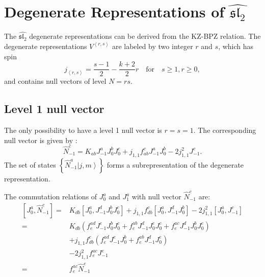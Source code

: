 \documentclass[10pt,a4paper]{article}
\numberwithin{equation}{section}
\newcommand{\ket}[1]{\left| #1 \right\rangle}
\newcommand{\vev}[1]{\left\langle #1 \right\rangle}
\begin{document}
\section{Degenerate Representations of \texorpdfstring{$\widehat{\mathfrak{sl}_{2}}$}{Lg}}
The $\widehat{\mathfrak{sl}_{2}}$ degenerate representations can be derived from the KZ-BPZ relation. The degenerate representations $V^{\vev{r,s}}$
 are labeled by two integer $r$ and $s$, which has spin
\begin{equation}
    j_{\vev{r,s}} = \frac{s-1}{2} - \frac{k+2}{2} r \quad \mathrm{for} \quad s\geq 1, r \geq 0,
\end{equation}
and contains null vectors of level $N=rs$.
\subsection{Level 1 null vector}
The only possibility to have a level 1 null vector is $r = s = 1$. The corresponding null vector is given by \cite{Stocco:2022gah}:
\begin{equation}
    \hat{N}^{c}_{-1} = K_{ab} J^{a}_{-1} J^{b}_{0} J^{c}_{0} + j_{1,1} f^{c}_{ab} J^{a}_{-1} J^{b}_{0} - 2 j^{2}_{1,1} J^{c}_{-1}. \label{NV}
\end{equation}
The set of states $\left\{ \hat{N}^{a}_{-1} \ket{j,m} \right\}$ forms a subrepresentation of the degenerate representation.\\
\par The commutation relations of $J^{a}_{0}$ and $J^{a}_{1}$ with null vector $\hat{N}^{c}_{-1}$ are:
\begin{equation}
    \begin{aligned}
        \left[ J^{a}_{0}, \hat{N}^{c}_{-1} \right] 
        =& K_{db} \left[J^{a}_{0}, J^{d}_{-1}J^{b}_{0}J^{c}_{0} \right] + 
            j_{1,1}f^{c}_{db}\left[J^{a}_{0},J^{d}_{-1}J^{b}_{0}\right] - 2 j^{2}_{1,1} \left[J^{a}_{0},J^{c}_{-1}\right]\\
        =& K_{db} \left(f^{ad}_{e}J^{e}_{-1}J^{b}_{0}J^{c}_{0} + f^{ab}_{e}J^{d}_{-1}J^{e}_{0}J^{c}_{0} + f^{ac}_{e}J^{d}_{-1}J^{b}_{0}J^{e}_{0}\right)\\
            &+ j_{1,1}f^{c}_{db} \left( f^{ad}_{e} J^{e}_{-1}J^{b}_{0} + f^{ab}_{e} J^{d}_{-1} J^{e}_{0} \right)\\
            &-2 j^{2}_{1,1} f^{ac}_{e} J^{e}_{-1}\\
        =& f^{ac}_{e} \hat{N}^{e}_{-1}
    \end{aligned}
\end{equation}
\end{document}
